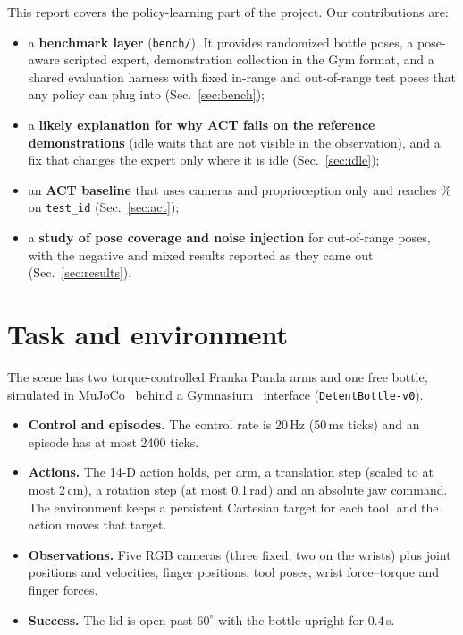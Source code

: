 \documentclass[10pt,twocolumn,letterpaper]{article}
\newcommand{\ttt}[1]{\texttt{\small #1}}
\begin{document}
This report covers the policy-learning part of the project. Our contributions are:
\begin{itemize}\itemsep0pt
  \item a \textbf{benchmark layer} (\ttt{bench/}). It provides randomized bottle poses, a pose-aware scripted
  expert, demonstration collection in the Gym format, and a shared evaluation harness with fixed in-range and
  out-of-range test poses that any policy can plug into (Sec.~\ref{sec:bench});
  \item a \textbf{likely explanation for why ACT fails on the reference demonstrations} (idle waits that are
  not visible in the observation), and a fix that changes the expert only where it is idle
  (Sec.~\ref{sec:idle});
  \item an \textbf{ACT baseline} that uses cameras and proprioception only and reaches \VtwoId\% on
  \ttt{test\_id} (Sec.~\ref{sec:act});
  \item a \textbf{study of pose coverage and noise injection} for out-of-range poses, with the negative and
  mixed results reported as they came out (Sec.~\ref{sec:results}).
\end{itemize}

\section{Task and environment}\label{sec:env}
The scene has two torque-controlled Franka Panda arms and one free bottle, simulated in MuJoCo~\cite{mujoco}
behind a Gymnasium~\cite{gymnasium} interface (\ttt{DetentBottle-v0}).
\begin{itemize}\itemsep0pt
  \item \textbf{Control and episodes.} The control rate is 20\,Hz (50\,ms ticks) and an episode has at most
  2400 ticks.
  \item \textbf{Actions.} The 14-D action holds, per arm, a translation step (scaled to at most 2\,cm), a
  rotation step (at most 0.1\,rad) and an absolute jaw command. The environment keeps a persistent Cartesian
  target for each tool, and the action moves that target.
  \item \textbf{Observations.} Five RGB cameras (three fixed, two on the wrists) plus joint positions and
  velocities, finger positions, tool poses, wrist force--torque and finger forces.
  \item \textbf{Success.} The lid is open past $60^\circ$ with the bottle upright for 0.4\,s.
\end{itemize}
\end{document}
